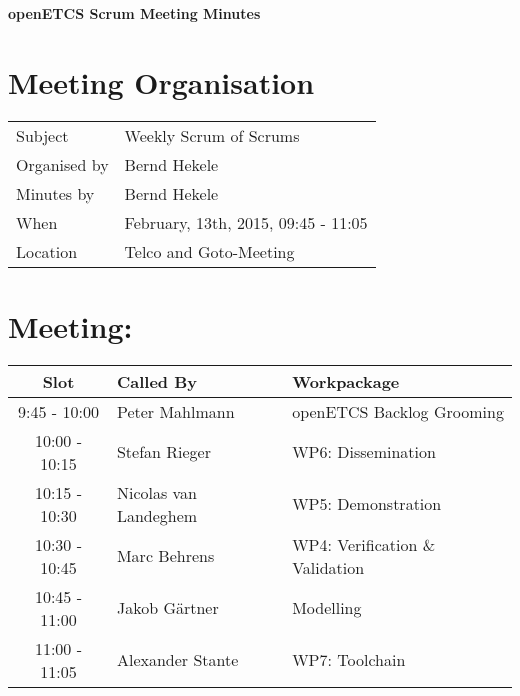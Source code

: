 \documentclass[a4paper, 11pt]{article}
\begin{document}
{\begin{center}\huge\bf openETCS Scrum Meeting Minutes\end{center}}
\section{Meeting Organisation}

\renewcommand{\arraystretch}{1.5}
\begin{supertabular}{m{.2\textwidth}m{.8\textwidth}}
Subject & Weekly Scrum of Scrums\\
Organised by &Bernd Hekele\\
Minutes by & Bernd Hekele\\
When & February, 13th, 2015, 09:45 - 11:05\\
Location & Telco and Goto-Meeting\\
\end{supertabular}

\renewcommand{\arraystretch}{1.0}
\section{Meeting:}

\begin{tabular}{|c|l|l|}
\hline
\textbf{Slot} &  \textbf{Called By} & \textbf{Workpackage} \\
\hline  
9:45 - 10:00 & Peter Mahlmann & openETCS Backlog Grooming  \\\hline
10:00 - 10:15 & Stefan Rieger & WP6: Dissemination \\\hline  
10:15 - 10:30 & Nicolas van Landeghem & WP5: Demonstration \\\hline  
10:30 - 10:45 & Marc Behrens & WP4: Verification \& Validation \\\hline  
10:45 - 11:00 & Jakob G\"artner & Modelling \\\hline  
11:00 - 11:05 & Alexander Stante  & WP7: Toolchain \\\hline
\end{tabular}
\end{document}
